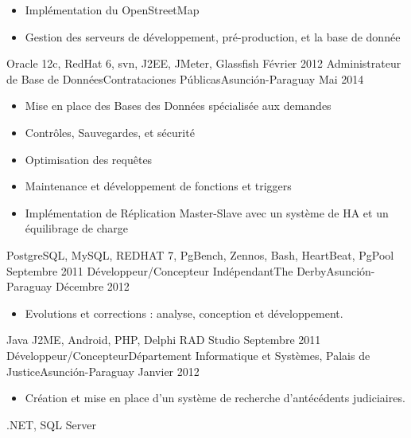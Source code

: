 \begin{experiences}
{\begin{itemize}
                        \item Implémentation du OpenStreetMap
                        \item Gestion des serveurs de développement, pré-production, et la base de donnée
                      \end{itemize}
				         }
                 {Oracle 12c, RedHat 6, svn, J2EE, JMeter, Glassfish}
  \emptySeparator
  \experience
    {Février 2012}   {Administrateur de Base de Données}{Contrataciones Públicas}{Asunción-Paraguay}
    {Mai 2014} {
                      \begin{itemize}
                        \item Mise en place des Bases des Données spécialisée aux demandes
                        \item Contrôles, Sauvegardes, et sécurité
                        \item Optimisation des requêtes
                        \item Maintenance et développement de fonctions et triggers
                        \item Implémentation de Réplication Master-Slave avec un système de HA et un équilibrage de charge
                      \end{itemize}
				}
                {PostgreSQL, MySQL, REDHAT 7, PgBench, Zennos, Bash, HeartBeat, PgPool}
  \emptySeparator
  \experience
    {Septembre 2011}   {Développeur/Concepteur Indépendant}{The Derby}{Asunción-Paraguay}
    {Décembre 2012} {
                      \begin{itemize}
                        \item Evolutions et corrections : analyse, conception et développement.
                      \end{itemize}
				}
                {Java J2ME, Android, PHP, Delphi RAD Studio}
  \emptySeparator
  \experience
    {Septembre 2011}   {Développeur/Concepteur}{Département Informatique et Systèmes, Palais de Justice}{Asunción-Paraguay}
    {Janvier 2012} {
                      \begin{itemize}
                        \item Création et mise en place d’un système de recherche d’antécédents judiciaires.
                      \end{itemize}
				}
                {.NET, SQL Server}
  \emptySeparator
\end{experiences}
